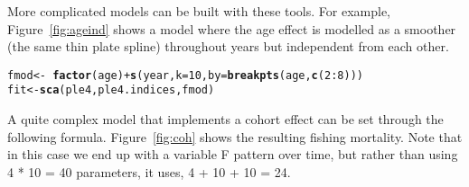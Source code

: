 \documentclass[a4paper,english,10pt]{article}\usepackage[]{graphicx}\usepackage[]{color}
\makeatletter
\newcommand{\hlnum}[1]{\textcolor[rgb]{0.686,0.059,0.569}{#1}}%
\newcommand{\hlopt}[1]{\textcolor[rgb]{0,0,0}{#1}}%
\newcommand{\hlstd}[1]{\textcolor[rgb]{0.345,0.345,0.345}{#1}}%
\newcommand{\hlkwb}[1]{\textcolor[rgb]{0.69,0.353,0.396}{#1}}%
\newcommand{\hlkwc}[1]{\textcolor[rgb]{0.333,0.667,0.333}{#1}}%
\newcommand{\hlkwd}[1]{\textcolor[rgb]{0.737,0.353,0.396}{\textbf{#1}}}%
\newenvironment{kframe}{%
 \def\at@end@of@kframe{}%
 \ifinner\ifhmode%
  \def\at@end@of@kframe{\end{minipage}}%
  \begin{minipage}{\columnwidth}%
 \fi\fi%
 \def\FrameCommand##1{\hskip\@totalleftmargin \hskip-\fboxsep
 \colorbox{shadecolor}{##1}\hskip-\fboxsep
     \hskip-\linewidth \hskip-\@totalleftmargin \hskip\columnwidth}%
 \MakeFramed {\advance\hsize-\width
   \@totalleftmargin\z@ \linewidth\hsize
   \@setminipage}}%
 {\par\unskip\endMakeFramed%
 \at@end@of@kframe}
\newenvironment{knitrout}{}{} %
\makeatother
\begin{document}
\begin{knitrout}
\color{fgcolor}\begin{kframe}


{\ttfamily\noindent\bfseries{}}\end{kframe}
\end{knitrout}

More complicated models can be built with these tools. For example, Figure~\ref{fig:ageind} shows a model where the age effect is modelled as a smoother (the same thin plate spline) throughout years but independent from each other.

\begin{knitrout}
\color{fgcolor}\begin{kframe}
\begin{alltt}
\hlstd{fmod} \hlkwb{<-} \hlopt{~} \hlkwd{factor}\hlstd{(age)} \hlopt{+} \hlkwd{s}\hlstd{(year,} \hlkwc{k}\hlstd{=}\hlnum{10}\hlstd{,} \hlkwc{by} \hlstd{=} \hlkwd{breakpts}\hlstd{(age,} \hlkwd{c}\hlstd{(}\hlnum{2}\hlopt{:}\hlnum{8}\hlstd{)))}
\hlstd{fit} \hlkwb{<-} \hlkwd{sca}\hlstd{(ple4, ple4.indices, fmod)}
\end{alltt}


{\ttfamily\noindent\bfseries{}}\end{kframe}
\end{knitrout}

\begin{knitrout}
\color{fgcolor}\begin{kframe}


{\ttfamily\noindent\bfseries{}}\end{kframe}
\end{knitrout}

A quite complex model that implements a cohort effect can be set through the following formula. Figure~\ref{fig:coh} shows the resulting fishing mortality. Note that in this case we end up with a variable F pattern over time, but rather than using 4 * 10 = 40 parameters, it uses, 4 + 10 + 10 = 24.
\end{document}
